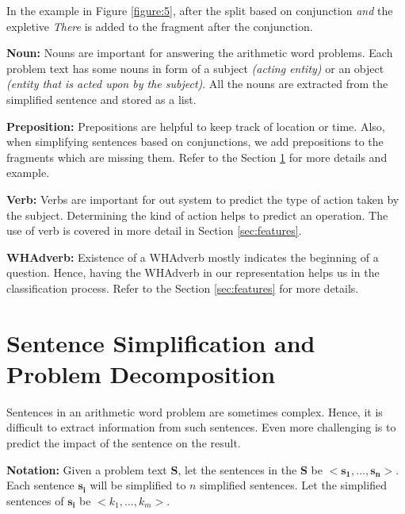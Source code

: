\documentclass[11pt]{article}
\begin{document}
In the example in Figure \ref{figure:5}, after the split based on conjunction \textit{and} the expletive \textit{There} is added to the fragment after the conjunction.
\vspace{4mm}

\textbf{Noun:} Nouns are important for answering the arithmetic word problems. Each problem text has some nouns in form of a subject \textit{(acting entity)} or an object \textit{(entity that is acted upon by the subject)}. All the nouns are extracted from the simplified sentence and stored as a list. 
\vspace{4mm}

\textbf{Preposition:} Prepositions are helpful to keep track of location or time. Also, when simplifying sentences based on conjunctions, we add prepositions to the fragments which are missing them. Refer to the Section \ref{sec:sentencesimplification} for more details and example.
\vspace{4mm}

\newpage

\textbf{Verb:} Verbs are important for out system to predict the type of action taken by the subject. Determining the kind of action helps to predict an operation. The use of verb is covered in more detail in Section \ref{sec:features}.
\vspace{4mm}

\textbf{WHAdverb:} Existence of a WHAdverb mostly indicates the beginning of a question. Hence, having the WHAdverb in our representation helps us in the classification process. Refer to the Section \ref{sec:features} for more details.

\section{Sentence Simplification and Problem Decomposition} \label{sec:sentencesimplification}
Sentences in an arithmetic word problem are sometimes complex. Hence, it is difficult to extract information from such sentences. Even more challenging is to predict the impact of the sentence on the result. 

\textbf{Notation:} Given a problem text $\mathbf{S}$, let the sentences in the $\mathbf{S}$ be $\mathbf{<s_{1},..., s_{n}>}$. Each sentence $\mathbf{s_{i}}$ will be simplified to \begin{math}n\end{math} simplified sentences. Let the simplified sentences of $\mathbf{s_{i}}$ be $\mathit{<k_{1},..., k_{m}>}$.
\end{document}
